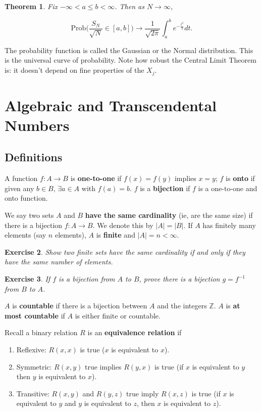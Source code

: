 \documentclass[12pt,letterpaper]{report}
\newcommand\be{\begin{equation}}
\newcommand\ee{\end{equation}}
\newcommand\ben{\begin{enumerate}}
\newcommand\een{\end{enumerate}}
\newcommand{\Z}{\ensuremath{\mathbb{Z}}}
\newtheorem{thm}{Theorem}[section]
\newtheorem{exe}[thm]{Exercise}
\begin{document}
\begin{thm} Fix $-\infty < a \le b < \infty$. Then as $N
\rightarrow \infty$,

\be \mbox{Prob}\Big( \frac{S_N}{\sqrt{N}} \in [a,b] \Big)
\rightarrow \frac{1}{\sqrt{2\pi}} \int_a^b e^{-\frac{t^2}{2}} dt.
\ee
\end{thm}

The probability function is called the Gaussian or the Normal
distribution. This is the universal curve of probability. Note how
robust the Central Limit Theorem is: it doesn't depend on fine
properties of the $X_j$.



\section{Algebraic and Transcendental Numbers}

\subsection{Definitions}

A function $f:A \rightarrow B$ is \textbf{one-to-one} if $f(x) =
f(y)$ implies $x = y$; $f$ is \textbf{onto} if given any $b\in B$,
$\exists a\in A$ with $f(a) = b$. $f$ is a \textbf{bijection} if
$f$ is a one-to-one and onto function.

We say two sets $A$ and $B$ \textbf{have the same cardinality}
(ie, are the same size) if there is a bijection $f: A \rightarrow
B$. We denote this by $|A| = |B|$. If $A$ has finitely many
elements (say $n$ elements), $A$ is \textbf{finite} and $|A| = n <
\infty$.

\begin{exe} Show two finite sets have the same cardinality if and
only if they have the same number of elements. \end{exe}

\begin{exe} If $f$ is a bijection from $A$ to $B$, prove there is a
bijection $g = f^{-1}$ from $B$ to $A$. \end{exe}

$A$ is \textbf{countable} if there is a bijection between $A$ and
the integers $\Z$. $A$ is \textbf{at most countable} if $A$ is
either finite or countable.

Recall a binary relation $R$ is an \textbf{equivalence relation}
if

\ben
\item Reflexive: $R(x,x)$ is true ($x$ is equivalent to $x$).
\item Symmetric: $R(x,y)$ true implies $R(y,x)$ is true (if $x$ is equivalent
to $y$ then $y$ is equivalent to $x$).
\item Transitive: $R(x,y)$ and $R(y,z)$ true imply $R(x,z)$ is true (if $x$ is
equivalent to $y$ and $y$ is equivalent to $z$, then $x$ is
equivalent to $z$). \een
\end{document}
